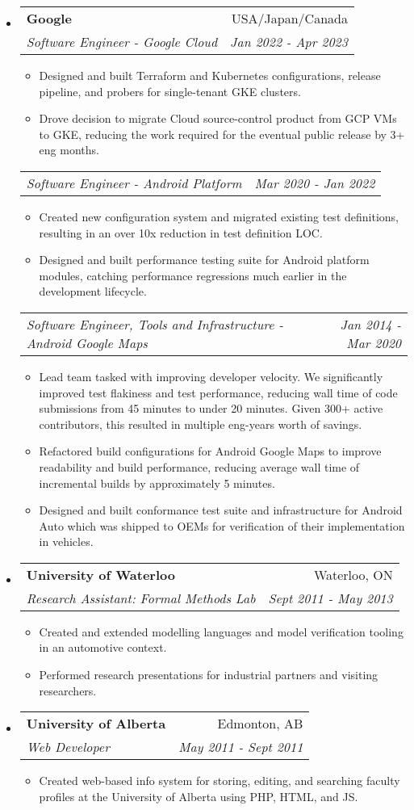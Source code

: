 \documentclass[letterpaper,11pt]{article}
\makeatletter
\newcommand{\resitem}[1]{\item #1 \vspace{-2pt}}
\newcommand{\ressubheading}[4]{
\begin{tabular*}{6.5in}{l@{\cftdotfill{\cftsecdotsep}\extracolsep{\fill}}r}
		\textbf{#1} & #2 \\
		\textit{#3} & \textit{#4} \\
\end{tabular*}\vspace{-6pt}}
\newcommand{\ressubsubheading}[2]{
\begin{tabular*}{6.5in}{l@{\cftdotfill{\cftsecdotsep}\extracolsep{\fill}}r}
	\textit{#1} & \textit{#2} \\
\end{tabular*}\vspace{-6pt}}
\makeatother
\begin{document}
\begin{itemize}[leftmargin=*]
\item[]
	\ressubheading{Google}{USA/Japan/Canada}{Software Engineer - Google Cloud}{Jan 2022 - Apr 2023}
	\begin{itemize}
		\resitem{Designed and built Terraform and Kubernetes configurations, release pipeline, and probers for single-tenant GKE clusters.}
		\resitem{Drove decision to migrate Cloud source-control product from GCP VMs to GKE, reducing the work required for the eventual public release by 3+ eng months.}
	\end{itemize}
	\ressubsubheading{Software Engineer - Android Platform}{Mar 2020 - Jan 2022}
	\begin{itemize}
		\resitem{Created new configuration system and migrated existing test definitions, resulting in an over 10x reduction in test definition LOC.}
		\resitem{Designed and built performance testing suite for Android platform modules, catching performance regressions much earlier in the development lifecycle.}
	\end{itemize}
	\ressubsubheading{Software Engineer, Tools and Infrastructure - Android Google Maps}{Jan 2014 - Mar 2020}
	\begin{itemize}
		\resitem{Lead team tasked with improving developer velocity. We significantly improved test flakiness and test performance, reducing wall time of code submissions from 45 minutes to under 20 minutes. Given 300+ active contributors, this resulted in multiple eng-years worth of savings.}
		\resitem{Refactored build configurations for Android Google Maps to improve readability and build performance, reducing average wall time of incremental builds by approximately 5 minutes.}
		\resitem{Designed and built conformance test suite and infrastructure for Android Auto which was shipped to OEMs for verification of their implementation in vehicles.}
	\end{itemize}

\item[]
	\ressubheading{University of Waterloo}{Waterloo, ON}{Research Assistant: Formal Methods Lab}{Sept 2011 - May 2013}
	\ifdefined\longresume
		\begin{itemize}
			\resitem{Created and extended modelling languages and model verification tooling in an automotive context.}
			\resitem{Performed research presentations for industrial partners and visiting researchers.}
		\end{itemize}
	\fi

\item[]
	\ressubheading{University of Alberta}{Edmonton, AB}{Web Developer}{May 2011 - Sept 2011}
	\ifdefined\longresume
		\begin{itemize}
			\resitem{Created web-based info system for storing, editing, and searching faculty profiles at the University of Alberta using PHP, HTML, and JS.}
		\end{itemize}
	\fi


\end{itemize}
\end{document}
